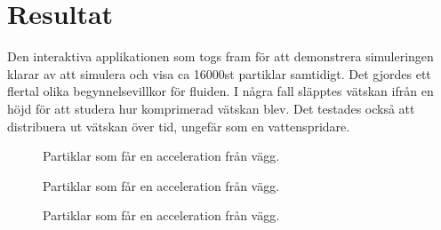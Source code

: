 \documentclass[a4paper,12pt,oneside,final]{extarticle}
\begin{document}
\section{Resultat}
Den interaktiva applikationen som togs fram för att demonstrera simuleringen klarar av att simulera och visa ca 16000st partiklar samtidigt.
Det gjordes ett flertal olika begynnelsevillkor för fluiden.
I några fall släpptes vätskan ifrån en höjd för att studera hur komprimerad vätskan blev.
Det testades också att distribuera ut vätskan över tid, ungefär som en vattenspridare.

\begin{figure}[H]
  \centering
    \setlength\fboxsep{0pt}
    \setlength\fboxrule{0.5pt}
  \caption{Partiklar som får en acceleration från vägg.}
\end{figure}

\begin{figure}[H]
  \centering
    \setlength\fboxsep{0pt}
    \setlength\fboxrule{0.5pt}
  \caption{Partiklar som får en acceleration från vägg.}
\end{figure}

\begin{figure}[H]
  \centering
    \setlength\fboxsep{0pt}
    \setlength\fboxrule{0.5pt}
  \caption{Partiklar som får en acceleration från vägg.}
\end{figure}
\end{document}
